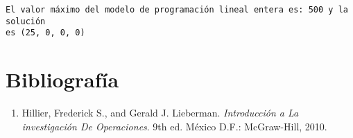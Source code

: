 \documentclass[11pt]{article}
\providecommand{\tightlist}{%
      \setlength{\itemsep}{0pt}\setlength{\parskip}{0pt}}
\begin{document}
    \begin{Verbatim}[commandchars=\\\{\}]
El valor máximo del modelo de programación lineal entera es: 500 y la solución
es (25, 0, 0, 0)
    \end{Verbatim}

    \hypertarget{bibliografuxeda}{%
\section{Bibliografía}\label{bibliografuxeda}}

    \begin{enumerate}
\def\labelenumi{\arabic{enumi}.}
\tightlist
\item
  Hillier, Frederick S., and Gerald J. Lieberman. \emph{Introducción a
  La investigación De Operaciones}. 9th ed. México D.F.: McGraw-Hill,
  2010.
\end{enumerate}


    
    
    
\end{document}
